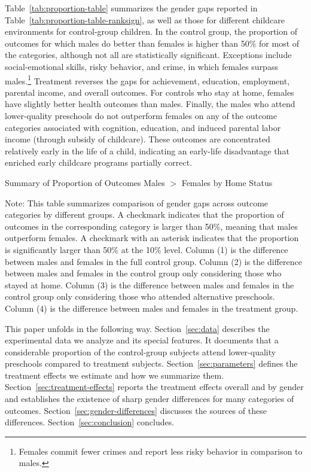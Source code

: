 Table~\ref{tab:proportion-table} summarizes the gender gaps reported in Table~\ref{tab:proportion-table-ranksign}, as well as those for different childcare environments for control-group children. In the control group, the proportion of outcomes for which males do better than females is higher than 50\% for most of the categories, although not all are statistically significant. Exceptions include social-emotional skills, risky behavior, and crime, in which females surpass males.\footnote{Females commit fewer crimes and report less risky behavior in comparison to males.} Treatment reverses the gaps for achievement, education, employment, parental income, and overall outcomes. For controls who stay at home, females have slightly better health outcomes than males. Finally, the males who attend lower-quality preschools do not outperform females on any of the outcome categories associated with cognition, education, and induced parental labor income (through subsidy of childcare). These outcomes are concentrated relatively early in the life of a child, indicating an early-life disadvantage that enriched early childcare programs partially correct.

\begin{table}[H]
\centering
\caption{Summary of Proportion of Outcomes Males $>$ Females by Home Status}
\label{tab:proportion-table}
\begin{threeparttable}

\begin{tablenotes}
\footnotesize
\item Note: This table summarizes comparison of gender gaps across outcome categories by different groups. A checkmark indicates that the proportion of outcomes in the corresponding category is larger than 50\%, meaning that males outperform females. A checkmark with an asterisk indicates that the proportion is significantly larger than 50\% at the 10\% level. Column (1) is the difference between males and females in the full control group.  Column (2) is the difference between males and females in the control group only considering those who stayed at home. Column (3) is the difference between males and females in the control group only considering those who attended alternative preschools. Column (4) is the difference between males and females in the treatment group.
\end{tablenotes}
\end{threeparttable}
\end{table}

This paper unfolds in the following way. Section~\ref{sec:data} describes the experimental data we analyze and its special features. It documents that a considerable proportion of the control-group subjects attend lower-quality preschools compared to treatment subjects. Section~\ref{sec:parameters} defines the treatment effects we estimate and how we summarize them. Section~\ref{sec:treatment-effects} reports the treatment effects overall and by gender and establishes the existence of sharp gender differences for many categories of outcomes. Section~\ref{sec:gender-differences} discusses the sources of these differences. Section~\ref{sec:conclusion} concludes.


